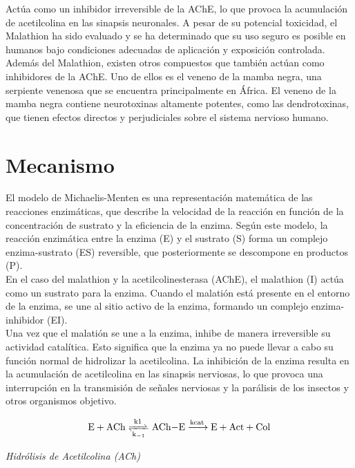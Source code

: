 Actúa como un inhibidor irreversible de la AChE, lo que provoca la acumulación de acetilcolina en las sinapsis neuronales. A pesar de su potencial toxicidad, el Malathion ha sido evaluado y se ha determinado que su uso seguro es posible en humanos bajo condiciones adecuadas de aplicación y exposición controlada.\cite{Geed2016} \\

Además del Malathion, existen otros compuestos que también actúan como inhibidores de la AChE. Uno de ellos es el veneno de la mamba negra, una serpiente venenosa que se encuentra principalmente en África. El veneno de la mamba negra contiene neurotoxinas altamente potentes, como las dendrotoxinas, que tienen efectos directos y perjudiciales sobre el sistema nervioso humano.\cite{klaassen2018casarett}\\

\section{Mecanismo}

El modelo de Michaelis-Menten es una representación matemática de las reacciones enzimáticas, que describe la velocidad de la reacción en función de la concentración de sustrato y la eficiencia de la enzima. Según este modelo, la reacción enzimática entre la enzima (E) y el sustrato (S) forma un complejo enzima-sustrato (ES) reversible, que posteriormente se descompone en productos (P).\\

En el caso del malathion y la acetilcolinesterasa (AChE), el malathion (I) actúa como un sustrato para la enzima. Cuando el malatión está presente en el entorno de la enzima, se une al sitio activo de la enzima, formando un complejo enzima-inhibidor (EI).\\
Una vez que el malatión se une a la enzima, inhibe de manera irreversible su actividad catalítica. Esto significa que la enzima ya no puede llevar a cabo su función normal de hidrolizar la acetilcolina. La inhibición de la enzima resulta en la acumulación de acetilcolina en las sinapsis nerviosas, lo que provoca una interrupción en la transmisión de señales nerviosas y la parálisis de los insectos y otros organismos objetivo.\cite{Geed2016}\\

\begin{Eq} [h!]
	\begin{equation}
		\ce{E + ACh <=>[{k1}][{k_{-1}}] ACh-E ->[kcat] E + Act + Col}\\
	\end{equation}
	\caption{\textit{Hidrólisis de Acetilcolina (ACh)}}
\end{Eq}

